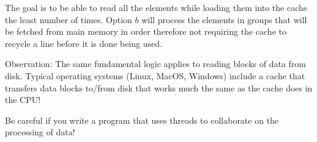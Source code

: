 \documentclass[10pt]{article}
\begin{document}
The goal is to be able to read all the elements while loading them into the cache the least 
number of times.  Option $b$ will process the elements in groups that will be fetched
from main memory in order therefore not requiring the cache to recycle a line before
it is done being used.



Observation: The same fundamental logic applies to reading blocks of data from disk.
Typical operating systems (Linux, MacOS, Windows) include a cache that transfers data
blocks to/from disk that works much the same as the cache does in the CPU!

Be careful if you write a program that uses threads to collaborate on the processing of
data!
\end{document}
